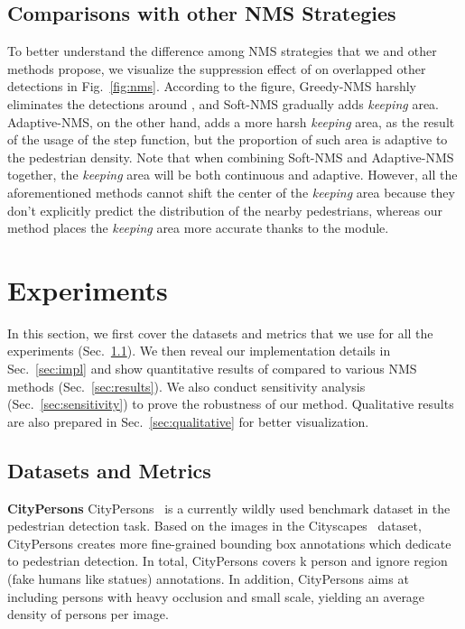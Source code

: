 \documentclass[sigconf]{acmart}
\begin{document}
\subsection{Comparisons with other NMS Strategies}
\label{sec:compare}
To better understand the difference among NMS strategies that we and other methods propose, we visualize the suppression effect of  on overlapped other detections in Fig.~\ref{fig:nms}. According to the figure, Greedy-NMS harshly eliminates the detections around , and Soft-NMS gradually adds \textit{keeping} area. Adaptive-NMS, on the other hand, adds a more harsh \textit{keeping} area, as the result of the usage of the step function, but the proportion of such area is adaptive to the pedestrian density. Note that when combining Soft-NMS and Adaptive-NMS together, the \textit{keeping} area will be both continuous and adaptive. However, all the aforementioned methods cannot shift the center of the \textit{keeping} area because they don't explicitly predict the distribution of the nearby pedestrians, whereas our method places the \textit{keeping} area more accurate thanks to the \heatmapnameshort{} module.

\section{Experiments}
\label{sec:experiments}
In this section, we first cover the datasets and metrics that we use for all the experiments (Sec.~\ref{sec:data}). We then reveal our implementation details in Sec.~\ref{sec:impl} and show quantitative results of \nmsname{} compared to various NMS methods (Sec.~\ref{sec:results}). We also conduct sensitivity analysis (Sec.~\ref{sec:sensitivity}) to prove the robustness of our method. Qualitative results are also prepared in Sec.~\ref{sec:qualitative} for better visualization.

\subsection{Datasets and Metrics}
\label{sec:data}
\textbf{CityPersons} CityPersons~\cite{citypersons} is a currently wildly used benchmark dataset in the pedestrian detection task. Based on the  images in the Cityscapes~\cite{cityscapes} dataset, CityPersons creates more fine-grained bounding box annotations which dedicate to pedestrian detection. In total, CityPersons covers k person and  ignore region (fake humans like statues) annotations. In addition, CityPersons aims at including persons with heavy occlusion and small scale, yielding an average density of  persons per image. 
\end{document}
